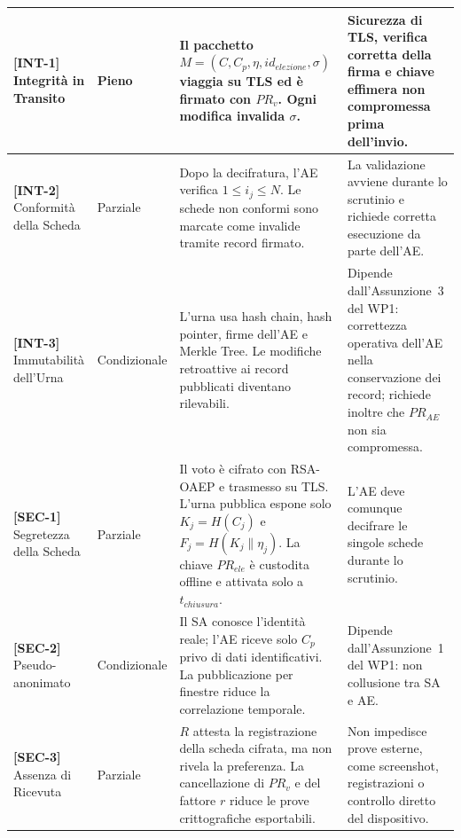 \begin{longtable}{| p{2.4cm} | p{2.5cm} | p{5cm} | p{4.1cm} |}
    \textbf{[INT-1]} \newline Integrità in Transito
    & Pieno
    & Il pacchetto $M = (C, C_p, \eta, id_{elezione}, \sigma)$ viaggia su TLS ed è firmato con $PR_v$. Ogni modifica invalida $\sigma$.
    & Sicurezza di TLS, verifica corretta della firma e chiave effimera non compromessa prima dell'invio. \\
    \hline

    \textbf{[INT-2]} \newline Conformità della Scheda
    & Parziale
    & Dopo la decifratura, l'AE verifica $1 \le i_j \le N$. Le schede non conformi sono marcate come invalide tramite record firmato.
    & La validazione avviene durante lo scrutinio e richiede corretta esecuzione da parte dell'AE. \\
    \hline

    \textbf{[INT-3]} \newline Immutabilità dell'Urna
    & Condizionale
    & L'urna usa hash chain, hash pointer, firme dell'AE e Merkle Tree. Le modifiche retroattive ai record pubblicati diventano rilevabili.
    & Dipende dall'Assunzione~3 del WP1: correttezza operativa dell'AE nella conservazione dei record; richiede inoltre che $PR_{AE}$ non sia compromessa. \\
    \hline

    \textbf{[SEC-1]} \newline Segretezza della Scheda
    & Parziale
    & Il voto è cifrato con RSA-OAEP e trasmesso su TLS. L'urna pubblica espone solo $K_j = H(C_j)$ e $F_j = H(K_j \parallel \eta_j)$. La chiave $PR_{ele}$ è custodita offline e attivata solo a $t_{chiusura}$.
    & L'AE deve comunque decifrare le singole schede durante lo scrutinio. \\
    \hline

    \textbf{[SEC-2]} \newline Pseudo-anonimato
    & Condizionale
    & Il SA conosce l'identità reale; l'AE riceve solo $C_p$ privo di dati identificativi. La pubblicazione per finestre riduce la correlazione temporale.
    & Dipende dall'Assunzione~1 del WP1: non collusione tra SA e AE. \\
    \hline

    \textbf{[SEC-3]} \newline Assenza di Ricevuta
    & Parziale
    & $R$ attesta la registrazione della scheda cifrata, ma non rivela la preferenza. La cancellazione di $PR_v$ e del fattore $r$ riduce le prove crittografiche esportabili.
    & Non impedisce prove esterne, come screenshot, registrazioni o controllo diretto del dispositivo. \\
    \hline


\end{longtable}
